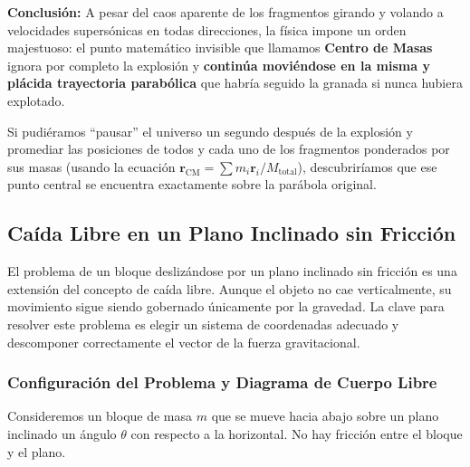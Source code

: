 \documentclass[11pt,a4paper]{book}
\begin{document}
\textbf{Conclusión:}
A pesar del caos aparente de los fragmentos girando y volando a velocidades supersónicas en todas direcciones, la física impone un orden majestuoso: el punto matemático invisible que llamamos \textbf{Centro de Masas} ignora por completo la explosión y \textbf{continúa moviéndose en la misma y plácida trayectoria parabólica} que habría seguido la granada si nunca hubiera explotado. 

Si pudiéramos ``pausar'' el universo un segundo después de la explosión y promediar las posiciones de todos y cada uno de los fragmentos ponderados por sus masas (usando la ecuación $\boldsymbol{r}_{\text{CM}} = {\sum m_i \boldsymbol{r}_i}/{M_{\text{total}}}$), descubriríamos que ese punto central se encuentra exactamente sobre la parábola original.

\subsection{Caída Libre en un Plano Inclinado sin Fricción}

El problema de un bloque deslizándose por un plano inclinado sin fricción es una extensión del concepto de caída libre. Aunque el objeto no cae verticalmente, su movimiento sigue siendo gobernado únicamente por la gravedad. La clave para resolver este problema es elegir un sistema de coordenadas adecuado y descomponer correctamente el vector de la fuerza gravitacional.

\subsubsection{Configuración del Problema y Diagrama de Cuerpo Libre}

Consideremos un bloque de masa $m$ que se mueve hacia abajo sobre un plano inclinado un ángulo $\theta$ con respecto a la horizontal. No hay fricción entre el bloque y el plano.
\end{document}
